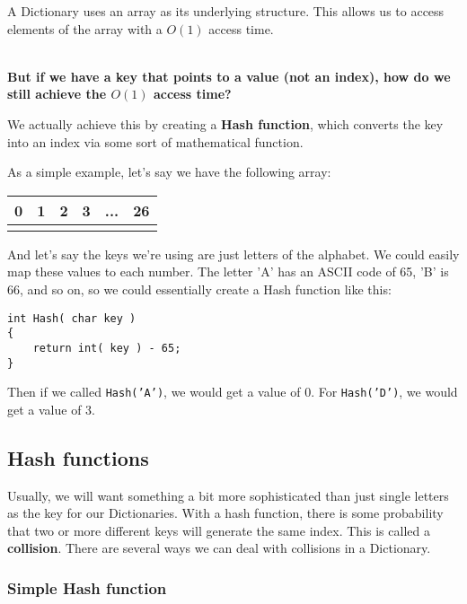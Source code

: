 \documentclass[a4paper,12pt,oneside]{book}
\begin{document}
A Dictionary uses an array as its underlying structure. This allows us
to access elements of the array with a $O(1)$ access time.

~\\
\textbf{But if we have a key that points to a value (not an index), how do we still
achieve the $O(1)$ access time?}

We actually achieve this by creating a \textbf{Hash function}, which
converts the key into an index via some sort of mathematical function.

As a simple example, let's say we have the following array:

\begin{center}
    \begin{tabular}{| c | c | c | c | c | c |}
        \hline
        0 & 1 & 2 & 3 & ... & 26
        \\ \hline
        & & & & &
        \\ \hline
    \end{tabular}
\end{center}

And let's say the keys we're using are just letters of the alphabet.
We could easily map these values to each number. The letter 'A' has an ASCII code of
65, 'B' is 66, and so on, so we could essentially create a Hash
function like this:

\begin{verbatim}
int Hash( char key )
{
    return int( key ) - 65;
}
\end{verbatim}

Then if we called \texttt{Hash('A')}, we would get a value of 0.
For \texttt{Hash('D')}, we would get a value of 3.

\subsection{Hash functions}

Usually, we will want something a bit more sophisticated than just
single letters as the key for our Dictionaries. With a hash
function, there is some probability that two or more different keys
will generate the same index. This is called a \textbf{collision}.
There are several ways we can deal with collisions in a Dictionary.

\subsubsection{Simple Hash function}
\end{document}
